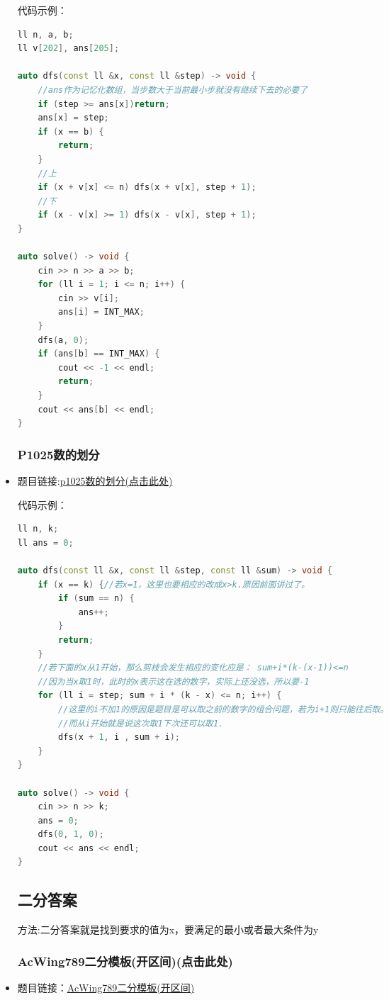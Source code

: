 \begin{itemize}
代码示例：\\
\begin{lstlisting}[language=C++]
ll n, a, b;
ll v[202], ans[205];

auto dfs(const ll &x, const ll &step) -> void {
	//ans作为记忆化数组，当步数大于当前最小步就没有继续下去的必要了
	if (step >= ans[x])return;
	ans[x] = step;
	if (x == b) {
		return;
	}
	//上
	if (x + v[x] <= n) dfs(x + v[x], step + 1);
	//下
	if (x - v[x] >= 1) dfs(x - v[x], step + 1);
}

auto solve() -> void {
	cin >> n >> a >> b;
	for (ll i = 1; i <= n; i++) {
		cin >> v[i];
		ans[i] = INT_MAX;
	}
	dfs(a, 0);
	if (ans[b] == INT_MAX) {
		cout << -1 << endl;
		return;
	}
	cout << ans[b] << endl;
}
\end{lstlisting}
\subsubsection{P1025数的划分}
\item 题目链接:\href{https://www.luogu.com.cn/problem/P1025}{p1025数的划分(点击此处)}

代码示例：\\
\begin{lstlisting}[language=C++]
ll n, k;
ll ans = 0;

auto dfs(const ll &x, const ll &step, const ll &sum) -> void {
	if (x == k) {//若x=1，这里也要相应的改成x>k.原因前面讲过了。
		if (sum == n) {
			ans++;
		}
		return;
	}
	//若下面的x从1开始，那么剪枝会发生相应的变化应是： sum+i*(k-(x-1))<=n
	//因为当x取1时，此时的x表示这在选的数字，实际上还没选，所以要-1
	for (ll i = step; sum + i * (k - x) <= n; i++) {
		//这里的i不加1的原因是题目是可以取之前的数字的组合问题，若为i+1则只能往后取。
		//而从i开始就是说这次取1下次还可以取1.
		dfs(x + 1, i , sum + i);
	}
}

auto solve() -> void {
	cin >> n >> k;
	ans = 0;
	dfs(0, 1, 0);
	cout << ans << endl;
}
\end{lstlisting}
\subsection{二分答案}
方法:二分答案就是找到要求的值为x，要满足的最小或者最大条件为y
\subsubsection{AcWing789二分模板(开区间)(点击此处)}
\item 题目链接：\href{https://www.acwing.com/problem/content/791/}{AcWing789二分模板(开区间)}


\end{itemize}
